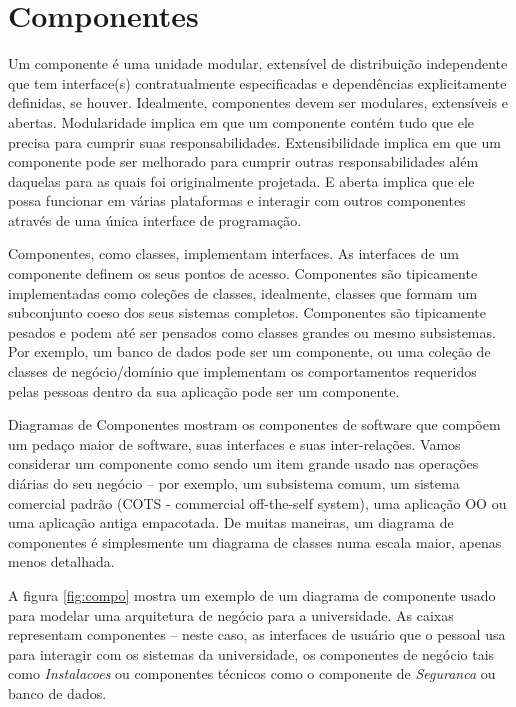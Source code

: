 \section{Componentes}

Um componente é uma unidade modular, extensível de distribuição independente que tem interface(s) contratualmente especificadas e dependências explicitamente definidas, se houver. Idealmente, componentes devem ser modulares, extensíveis e abertas. Modularidade implica em que um componente contém tudo que ele precisa para cumprir suas responsabilidades. Extensibilidade implica em que um componente pode ser melhorado para cumprir outras responsabilidades além daquelas para as quais foi originalmente projetada. E aberta implica que ele possa funcionar em várias plataformas e interagir com outros componentes através de uma única interface de programação.

Componentes, como classes, implementam interfaces. As interfaces de um componente definem os seus pontos de acesso. Componentes são tipicamente implementadas como coleções de classes, idealmente, classes que formam um subconjunto coeso dos seus sistemas completos. Componentes são tipicamente pesados e podem até ser pensados como classes grandes ou mesmo subsistemas. Por exemplo, um banco de dados pode ser um componente, ou uma coleção de classes de negócio/domínio que implementam os comportamentos requeridos pelas pessoas dentro da sua aplicação pode ser um componente.

Diagramas de Componentes mostram os componentes de software que compõem um pedaço maior de software, suas interfaces e suas inter-relações. Vamos considerar um componente como sendo um item grande usado nas operações diárias do seu negócio -- por exemplo, um subsistema comum, um sistema comercial padrão (COTS - commercial off-the-self system), uma aplicação OO ou uma aplicação antiga empacotada. De muitas maneiras, um diagrama de componentes é simplesmente um diagrama de classes numa escala maior, apenas menos detalhada.

A figura \ref{fig:compo} mostra um exemplo de um diagrama de componente usado para modelar uma arquitetura de negócio para a universidade. As caixas representam componentes -- neste caso, as interfaces de usuário que o pessoal usa para interagir com os sistemas da universidade, os componentes de negócio tais como \emph{Instalacoes} ou componentes técnicos como o componente de \emph{Seguranca} ou banco de dados.

